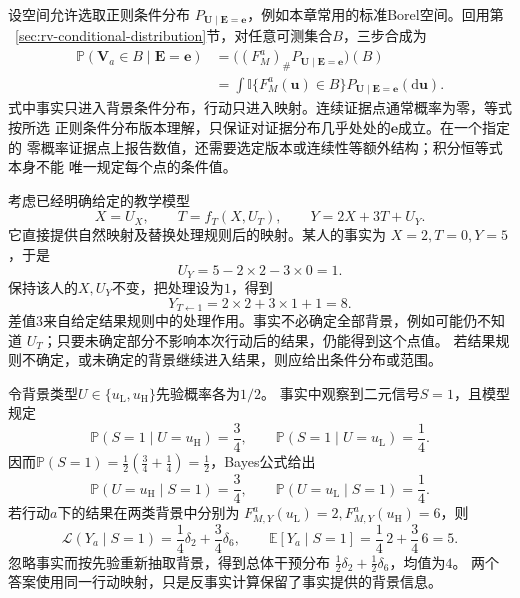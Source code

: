 设空间允许选取正则条件分布
\(P_{\bm U\mid\bm E=\bm e}\)，例如本章常用的标准Borel空间。回用第
~\ref{sec:rv-conditional-distribution}节，对任意可测集合\(B\)，三步合成为
\begin{equation}
  \begin{aligned}
    \mathbb P(\bm V_a\in B\mid\bm E=\bm e)
    &=
    \bigl((F_M^a)_{\#}
      P_{\bm U\mid\bm E=\bm e}\bigr)(B)\\
    &=
    \int\mathbb I\{F_M^a(\bm u)\in B\}
      P_{\bm U\mid\bm E=\bm e}(\mathrm d\bm u).
  \end{aligned}
  \label{eq:causal-counterfactual-pushforward}
\end{equation}
式中事实只进入背景条件分布，行动只进入映射。连续证据点通常概率为零，等式按所选
正则条件分布版本理解，只保证对证据分布几乎处处的\(\bm e\)成立。在一个指定的
零概率证据点上报告数值，还需要选定版本或连续性等额外结构；积分恒等式本身不能
唯一规定每个点的条件值。

考虑已经明确给定的教学模型
\begin{equation}
  X=U_X,\qquad
  T=f_T(X,U_T),\qquad
  Y=2X+3T+U_Y.
  \label{eq:causal-counterfactual-linear-example}
\end{equation}
它直接提供自然映射及替换处理规则后的映射。某人的事实为
\(X=2,T=0,Y=5\)，于是
\[
  U_Y=5-2\times2-3\times0=1.
\]
保持该人的\(X,U_Y\)不变，把处理设为\(1\)，得到
\[
  Y_{T\leftarrow1}=2\times2+3\times1+1=8.
\]
差值\(3\)来自给定结果规则中的处理作用。事实不必确定全部背景，例如可能仍不知道
\(U_T\)；只要未确定部分不影响本次行动后的结果，仍能得到这个点值。
若结果规则不确定，或未确定的背景继续进入结果，则应给出条件分布或范围。

\begin{example}[两点背景后验的反事实推前]
  \label{ex:causal-two-point-background-posterior}
  令背景类型\(U\in\{u_{\mathrm L},u_{\mathrm H}\}\)先验概率各为\(1/2\)。
  事实中观察到二元信号\(S=1\)，且模型规定
  \[
    \mathbb P(S=1\mid U=u_{\mathrm H})=\frac34,\qquad
    \mathbb P(S=1\mid U=u_{\mathrm L})=\frac14.
  \]
  因而\(\mathbb P(S=1)=\frac12(\frac34+\frac14)=\frac12\)，Bayes公式给出
  \[
    \mathbb P(U=u_{\mathrm H}\mid S=1)=\frac34,\qquad
    \mathbb P(U=u_{\mathrm L}\mid S=1)=\frac14.
  \]
  若行动\(a\)下的结果在两类背景中分别为
  \(F_{M,Y}^a(u_{\mathrm L})=2,F_{M,Y}^a(u_{\mathrm H})=6\)，则
  \[
    \mathcal L(Y_a\mid S=1)=\frac14\delta_2+\frac34\delta_6,\qquad
    \mathbb E[Y_a\mid S=1]=\frac14\,2+\frac34\,6=5.
  \]
  忽略事实而按先验重新抽取背景，得到总体干预分布
  \(\frac12\delta_2+\frac12\delta_6\)，均值为\(4\)。
  两个答案使用同一行动映射，只是反事实计算保留了事实提供的背景信息。
\end{example}

